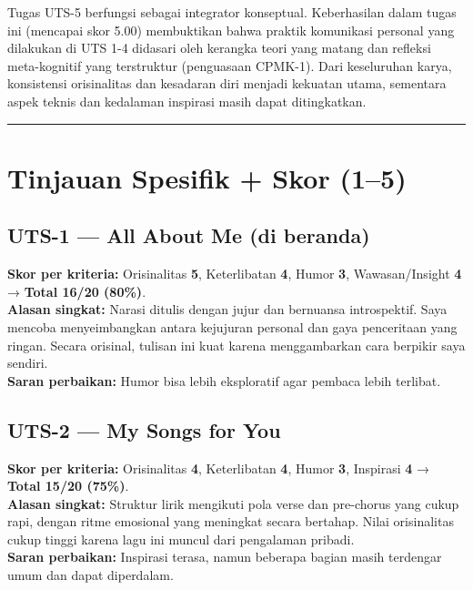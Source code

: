 \documentclass[
  letterpaper,
  DIV=11,
  numbers=noendperiod]{scrreprt}
\begin{document}
Tugas UTS-5 berfungsi sebagai integrator konseptual. Keberhasilan dalam
tugas ini (mencapai skor 5.00) membuktikan bahwa praktik komunikasi
personal yang dilakukan di UTS 1-4 didasari oleh kerangka teori yang
matang dan refleksi meta-kognitif yang terstruktur (penguasaan CPMK-1).
Dari keseluruhan karya, konsistensi orisinalitas dan kesadaran diri
menjadi kekuatan utama, sementara aspek teknis dan kedalaman inspirasi
masih dapat ditingkatkan.

\begin{center}\rule{0.5\linewidth}{0.5pt}\end{center}

\section{Tinjauan Spesifik + Skor
(1--5)}\label{tinjauan-spesifik-skor-15}

\subsection{UTS-1 --- All About Me (di
beranda)}\label{uts-1-all-about-me-di-beranda}

\textbf{Skor per kriteria:} Orisinalitas \textbf{5}, Keterlibatan
\textbf{4}, Humor \textbf{3}, Wawasan/Insight \textbf{4} → \textbf{Total
16/20 (80\%)}.\\
\textbf{Alasan singkat:} Narasi ditulis dengan jujur dan bernuansa
introspektif. Saya mencoba menyeimbangkan antara kejujuran personal dan
gaya penceritaan yang ringan. Secara orisinal, tulisan ini kuat karena
menggambarkan cara berpikir saya sendiri.\\
\textbf{Saran perbaikan:} Humor bisa lebih eksploratif agar pembaca
lebih terlibat.

\subsection{UTS-2 --- My Songs for You}\label{uts-2-my-songs-for-you-1}

\textbf{Skor per kriteria:} Orisinalitas \textbf{4}, Keterlibatan
\textbf{4}, Humor \textbf{3}, Inspirasi \textbf{4} → \textbf{Total 15/20
(75\%)}.\\
\textbf{Alasan singkat:} Struktur lirik mengikuti pola verse dan
pre-chorus yang cukup rapi, dengan ritme emosional yang meningkat secara
bertahap. Nilai orisinalitas cukup tinggi karena lagu ini muncul dari
pengalaman pribadi.\\
\textbf{Saran perbaikan:} Inspirasi terasa, namun beberapa bagian masih
terdengar umum dan dapat diperdalam.
\end{document}
